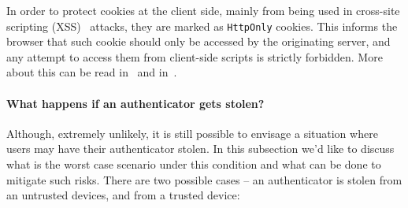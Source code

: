 \documentclass[a4paper,12pt,oneside,openright]{memoir}
\begin{document}
	In order to protect cookies at the client side, mainly from being used in cross-site scripting (XSS)~\cite{XXS} attacks, they are marked as \texttt{HttpOnly} cookies.
	This informs the browser that such cookie should only be accessed by the originating server, and any attempt to access them from client-side scripts is strictly forbidden.
	More about this can be read in~\cite{OWASP_HttpOnly} and in~\cite{HttpOnly}.

	\paragraph{What happens if an authenticator gets stolen?}
	Although, extremely unlikely, it is still possible to envisage a situation where users may have their authenticator stolen.
	In this subsection we'd like to discuss what is the worst case scenario under this condition and what can be done to mitigate such risks.
	There are two possible cases -- an authenticator is stolen from an untrusted devices, and from a trusted device:
\end{document}
